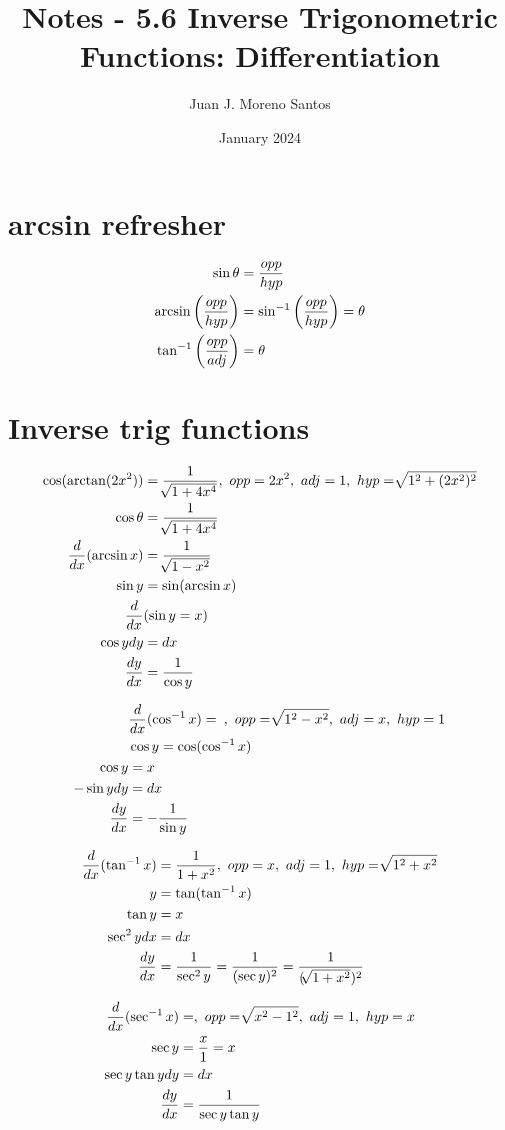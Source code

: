 \documentclass[11pt]{article}
\newcommand*{\set}{\setcounter{equation}{0}}
\newcommand*{\lt}{\left}
\newcommand*{\rt}{\right}
\begin{document}
\title{Notes - 5.6 Inverse Trigonometric Functions: Differentiation}
\author{Juan J. Moreno Santos}
\date{January 2024}

\maketitle
\section{arcsin refresher}
\begin{align}
    \set
    \sin\theta&=\frac{opp}{hyp}\\
    \arcsin\lt(\frac{opp}{hyp}\rt)&=\sin^{-1}\lt(\frac{opp}{hyp}\rt)=\theta\\
    \tan^{-1}\lt(\frac{opp}{adj}\rt)&=\theta\\
\end{align}
\section{Inverse trig functions}
\begin{align}
    \set
    \cos(\arctan(2x^2))&=\frac{1}{\sqrt[]{1+4x^4}},\,\, opp=2x^2,\,\, adj=1,\,\, hyp=\sqrt[]{1^2+(2x^2)^2}\\
    \cos\theta&=\frac{1}{\sqrt[]{1+4x^4}}\\
    \frac{d}{dx}(\arcsin x)&=\frac{1}{\sqrt[]{1-x^2}}\\
    \sin y&=\sin(\arcsin x)\\
    \frac{d}{dx}&(\sin y=x)\\
    \cos ydy&=dx\\
    \frac{dy}{dx}&=\frac{1}{\cos y}
\end{align}

\begin{align}
    \set
    &\frac{d}{dx}(\cos^{-1}x)=\frac{}{},\,\, opp=\sqrt[]{1^2-x^2},\,\, adj=x,\,\, hyp=1\\
    &\cos y=\cos(\cos^{-1}x)\\
    \cos y&=x\\
    -\sin ydy&=dx\\
    \frac{dy}{dx}&=-\frac{1}{\sin y}
\end{align}

\begin{align}
    \set
    \frac{d}{dx}(\tan^{-1}x)&=\frac{1}{1+x^2},\,\, opp=x,\,\, adj=1,\,\, hyp=\sqrt[]{1^2+x^2}\\
    y&=\tan(\tan^{-1}x)\\
    \tan y&=x\\
    \sec^2ydx&=dx\\
    \frac{dy}{dx}&=\frac{1}{\sec^2 y}=\frac{1}{(\sec y)^2}=\frac{1}{(\sqrt[]{1+x^2})^2}
\end{align}

\begin{align}
    \set
    \frac{d}{dx}(\sec^{-1}x)&=,\,\, opp=\sqrt[]{x^2-1^2},\,\, adj=1,\,\, hyp=x\\
    \sec y&=\frac{x}{1}=x\\
    \sec y\tan ydy&=dx\\
    \frac{dy}{dx}&=\frac{1}{\sec y\tan y}
\end{align}
\end{document}
